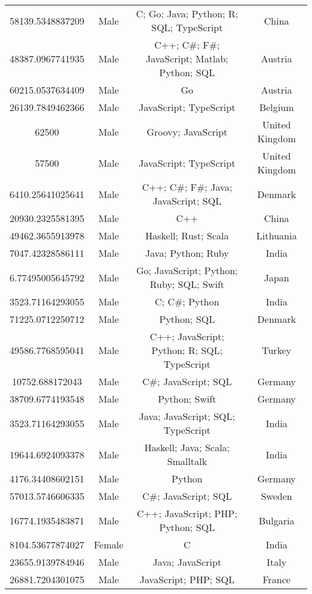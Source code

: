 \begin{center}
\begin{tabular}{ |c|c|c|c| }
58139.5348837209  &  Male  &  C; Go; Java; Python; R; SQL; TypeScript  &  China  \\ 
48387.0967741935  &  Male  &  C++; C\#; F\#; JavaScript; Matlab; Python; SQL  &  Austria  \\ 
60215.0537634409  &  Male  &  Go  &  Austria  \\ 
26139.7849462366  &  Male  &  JavaScript; TypeScript  &  Belgium  \\ 
62500  &  Male  &  Groovy; JavaScript  &  United Kingdom  \\ 
57500  &  Male  &  JavaScript; TypeScript  &  United Kingdom  \\ 
6410.25641025641  &  Male  &  C++; C\#; F\#; Java; JavaScript; SQL  &  Denmark  \\ 
20930.2325581395  &  Male  &  C++  &  China  \\ 
49462.3655913978  &  Male  &  Haskell; Rust; Scala  &  Lithuania  \\ 
7047.42328586111  &  Male  &  Java; Python; Ruby  &  India  \\ 
6.77495005645792  &  Male  &  Go; JavaScript; Python; Ruby; SQL; Swift  &  Japan  \\ 
3523.71164293055  &  Male  &  C; C\#; Python  &  India  \\ 
71225.0712250712  &  Male  &  Python; SQL  &  Denmark  \\ 
49586.7768595041  &  Male  &  C++; JavaScript; Python; R; SQL; TypeScript  &  Turkey  \\ 
10752.688172043  &  Male  &  C\#; JavaScript; SQL  &  Germany  \\ 
38709.6774193548  &  Male  &  Python; Swift  &  Germany  \\ 
3523.71164293055  &  Male  &  Java; JavaScript; SQL; TypeScript  &  India  \\ 
19644.6924093378  &  Male  &  Haskell; Java; Scala; Smalltalk  &  India  \\ 
4176.34408602151  &  Male  &  Python  &  Germany  \\ 
57013.5746606335  &  Male  &  C\#; JavaScript; SQL  &  Sweden  \\ 
16774.1935483871  &  Male  &  C++; JavaScript; PHP; Python; SQL  &  Bulgaria  \\ 
8104.53677874027  &  Female  &  C  &  India  \\ 
23655.9139784946  &  Male  &  Java; JavaScript  &  Italy  \\ 
26881.7204301075  &  Male  &  JavaScript; PHP; SQL  &  France  \\ 

\end{tabular}
\end{center}
